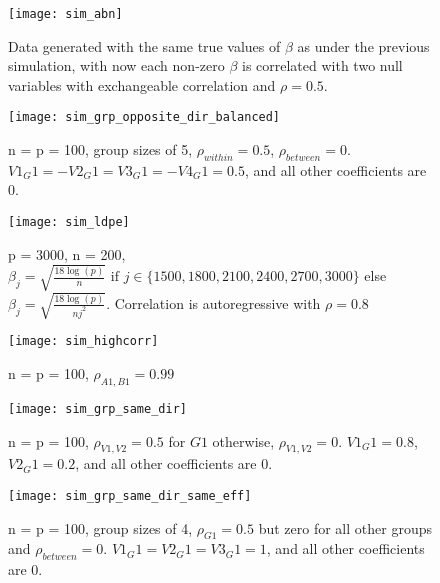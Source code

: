 \begin{figure}[hbtp]
    \begin{center}
    \texttt{[image: sim\_abn]}
    \caption{\label{Fig:sim_abn} Data generated with the same true values of $\beta$ as under the previous simulation, with now each non-zero $\beta$ is correlated with two null variables with exchangeable correlation and $\rho = 0.5$.}
    \end{center}
\end{figure}

\begin{figure}[hbtp]
    \begin{center}
    \texttt{[image: sim\_grp\_opposite\_dir\_balanced]}
    \caption{\label{Fig:sim_grp_opposite_dir_balanced} n = p = 100, group sizes of 5, $\rho_{within} = 0.5$, $\rho_{between} = 0$. $V1_G1 = -V2_G1 = V3_G1 = -V4_G1 = 0.5$, and all other coefficients are 0.}
    \end{center}
\end{figure}

\begin{figure}[hbtp]
    \begin{center}
    \texttt{[image: sim\_ldpe]}
    \caption{\label{Fig:sim_ldpe} p = 3000, n = 200, $\beta_j = \sqrt{\frac{18\log(p)}{n}} \text{ if } j \in \lbrace 1500, 1800, 2100, 2400, 2700, 3000 \rbrace$ else $\beta_j = \sqrt{\frac{18\log(p)}{nj^2}}$. Correlation is autoregressive with $\rho = 0.8$}
    \end{center}
\end{figure}


\begin{figure}[hbtp]
    \begin{center}
    \texttt{[image: sim\_highcorr]}
    \caption{\label{Fig:sim_highcorr} n = p = 100, $\rho_{A1, B1} = 0.99$}
    \end{center}
\end{figure}

\begin{figure}[hbtp]
    \begin{center}
    \texttt{[image: sim\_grp\_same\_dir]}
    \caption{\label{Fig:sim_grp_same_dir} n = p = 100, $\rho_{V1, V2} = 0.5$ for $G1$ otherwise, $\rho_{V1, V2} = 0$. $V1_G1 = 0.8$, $V2_G1 = 0.2$, and all other coefficients are 0.}
    \end{center}
\end{figure}

\begin{figure}[hbtp]
    \begin{center}
    \texttt{[image: sim\_grp\_same\_dir\_same\_eff]}
    \caption{\label{Fig:sim_grp_same_dir_same_eff} n = p = 100, group sizes of 4, $\rho_{G1} = 0.5$ but zero for all other groups and $\rho_{between} = 0$. $V1_G1 = V2_G1 = V3_G1 = 1$, and all other coefficients are 0.}
    \end{center}
\end{figure}

